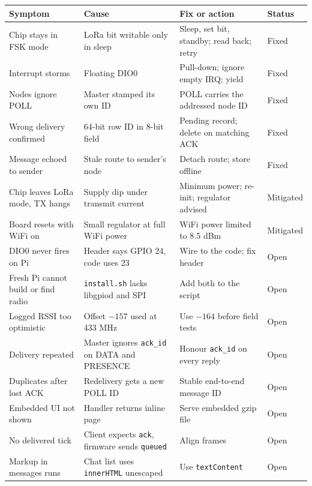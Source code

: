\documentclass{tietreport}
\begin{document}
{\small
\begin{longtable}{|p{1.3in}|p{1.65in}|p{1.7in}|p{0.7in}|}
  \hline
  \textbf{Symptom} & \textbf{Cause} & \textbf{Fix or action} &
  \textbf{Status} \\
  \hline
  \endhead
  Chip stays in FSK mode &
  LoRa bit writable only in sleep &
  Sleep, set bit, standby; read back; retry & Fixed \\
  \hline
  Interrupt storms &
  Floating DIO0 &
  Pull-down; ignore empty IRQ; yield & Fixed \\
  \hline
  Nodes ignore POLL &
  Master stamped its own ID &
  POLL carries the addressed node ID & Fixed \\
  \hline
  Wrong delivery confirmed &
  64-bit row ID in 8-bit field &
  Pending record; delete on matching ACK & Fixed \\
  \hline
  Message echoed to sender &
  Stale route to sender's node &
  Detach route; store offline & Fixed \\
  \hline
  Chip leaves LoRa mode, TX hangs &
  Supply dip under transmit current &
  Minimum power; re-init; regulator advised & Mitigated \\
  \hline
  Board resets with WiFi on &
  Small regulator at full WiFi power &
  WiFi power limited to 8.5 dBm & Mitigated \\
  \hline
  DIO0 never fires on Pi &
  Header says GPIO 24, code uses 23 &
  Wire to the code; fix header & Open \\
  \hline
  Fresh Pi cannot build or find radio &
  \texttt{install.sh} lacks libgpiod and SPI &
  Add both to the script & Open \\
  \hline
  Logged RSSI too optimistic &
  Offset $-157$ used at 433 MHz &
  Use $-164$ before field tests & Open \\
  \hline
  Delivery repeated &
  Master ignores \texttt{ack\_id} on DATA and PRESENCE &
  Honour \texttt{ack\_id} on every reply & Open \\
  \hline
  Duplicates after lost ACK &
  Redelivery gets a new POLL ID &
  Stable end-to-end message ID & Open \\
  \hline
  Embedded UI not shown &
  Handler returns inline page &
  Serve embedded gzip file & Open \\
  \hline
  No delivered tick &
  Client expects \texttt{ack}, firmware sends \texttt{queued} &
  Align frames & Open \\
  \hline
  Markup in messages runs &
  Chat list uses \texttt{innerHTML} unescaped &
  Use \texttt{textContent} & Open \\

\end{longtable}}
\end{document}
